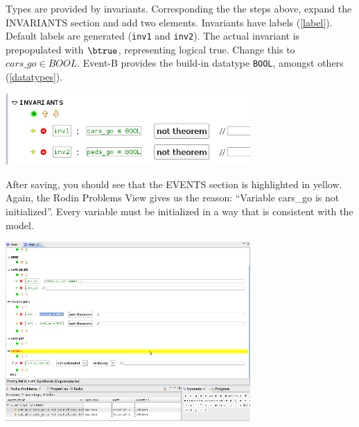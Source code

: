 Types are provided by invariants.  Corresponding the the steps above, expand the \textsf{INVARIANTS} section and add two elements.  Invariants have labels (\ref{label}).  Default labels are generated (\texttt{inv1} and \texttt{inv2}).  The actual invariant is prepopulated with $\btrue$, representing logical true.  Change this to $cars\_go \in  BOOL$.  Event-B provides the build-in datatype \texttt{BOOL}, amongst others (\ref{datatypes}).

\begin{center}
	\includegraphics[width=0.7\textwidth]{img/tutorial/invariants.png}
\end{center}


After saving, you should see that the \textsf{EVENTS} section is highlighted in yellow.  Again, the \textsf{Rodin Problems} View gives us the reason: ``Variable cars\_go is not initialized''.  Every variable must be initialized in a way that is consistent with the model.
\begin{center}
	\includegraphics[width=0.7\textwidth]{img/tutorial/yellow.png}
\end{center}

